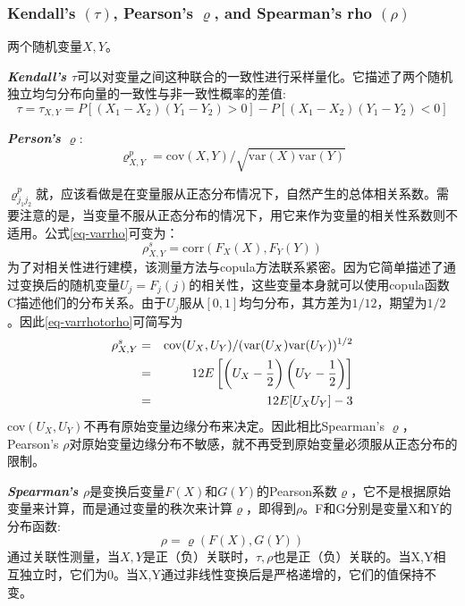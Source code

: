 \subsubsection{Kendall's $(\tau)$, Pearson's $\varrho$, and Spearman's rho $(\rho)$}
两个随机变量$X,Y$。

\emph{\textbf{\textcolor[rgb]{1,0,0}{Kendall's $\tau$}}}可以对变量之间这种联合的一致性进行采样量化。它描述了两个随机独立均匀分布向量的一致性与非一致性概率的差值\cite{Montes2015}:
\begin{equation}
    \tau = \tau_{X,Y} = P[(X_1-X_2)(Y_1-Y_2) > 0] - P[(X_1-X_2)(Y_1-Y_2)<0]
    \label{eq-tau}
\end{equation}

\emph{\textbf{\textcolor[rgb]{1,0,0}{Person's $\varrho$}}}:
\begin{equation}   
    \label{eq-varrho}
    \varrho^{p}_{X,Y} = \text{cov}(X,Y)/\sqrt{\text{var}(X)\text{var}(Y)}
\end{equation}


$\varrho_{j_1 j_2}^{p}$就，应该看做是在变量服从正态分布情况下，自然产生的总体相关系数。需要注意的是，当变量不服从正态分布的情况下，用它来作为变量的相关性系数则不适用\cite{Smith2009}。公式\ref{eq-varrho}可变为：
\begin{equation}
    \rho_{X,Y}^s = \text{corr}(F_{X}(X),F_{Y}(Y))
    \label{eq-varrhotorho}
\end{equation}
为了对相关性进行建模，该测量方法与copula方法联系紧密。因为它简单描述了通过变换后的随机变量$U_j = F_j(j)$的相关性，这些变量本身就可以使用copula函数C描述他们的分布关系。\textcolor[rgb]{1,0,0}{由于$U_j$服从$[0,1]$均匀分布}，其方差为$1/12$，期望为$1/2$。因此\cref{eq-varrhotorho}可简写为
\begin{eqnarray}
    \rho_{X,Y}^s &=& \text{cov}(U_{X},U_{Y})/(\text{var}(U_{X})\text{var}(U_{Y}))^{1/2} \notag \\
    &=& 12E \left[ \left(U_{X} - \dfrac{1}{2}\right)\left(U_{Y} - \dfrac{1}{2}\right) \right] \notag \\
    &=& 12E [U_{X}U_{Y}] -3
    \label{eq-rhoSimplified}
\end{eqnarray}
cov$(U_X,U_Y)$不再有原始变量边缘分布来决定。因此相比Spearman's $\varrho$，Pearson's $\rho$对原始变量边缘分布不敏感，就不再受到原始变量必须服从正态分布的限制。



\emph{\textbf{\textcolor[rgb]{1,0,0}{Spearman's $\rho$}}}是变换后变量$F(X)$和$G(Y)$的Pearson系数$\varrho$\cite{Montes2015}，它不是根据原始变量来计算，而是通过变量的秩次来计算$\varrho$，即得到$\rho$。F和G分别是变量X和Y的分布函数:
\begin{equation}
    \label{eq-rho}
    \rho = \varrho(F(X),G(Y))
\end{equation}
通过关联性测量，当$X,Y$是正（负）关联时，$\tau,\rho$也是正（负）关联的。当X,Y相互独立时，它们为0。当X,Y通过非线性变换后是严格递增的，它们的值保持不变。

